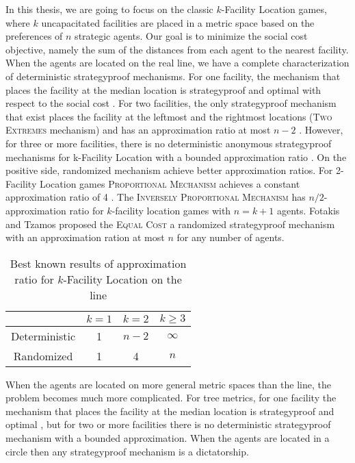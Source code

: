 In this thesis, we are going to focus on the classic $k$-Facility Location games, where $k$ uncapacitated facilities are placed in a metric space based on the preferences of $n$ strategic agents. Our goal is to minimize the social cost objective, namely the sum of the distances from each agent to the nearest facility. When the agents are located on the real line, we have a complete characterization of deterministic strategyproof mechanisms. For one facility, the mechanism that places the facility at the median location is strategyproof and optimal with respect to the social cost \cite{Procaccia2013}. For two facilities, the only strategyproof mechanism that exist places the facility at the leftmost and the rightmost locations (\textsc{Two Extremes} mechanism) and has an approximation ratio at most $n-2$ \cite{Procaccia2013,Fotakis2014}. However, for three or more facilities, there is no deterministic anonymous strategyproof mechanisms for k-Facility Location with a bounded approximation ratio \cite{Fotakis2014}. On the positive side, randomized mechanism achieve better approximation ratios. For 2-Facility Location games \textsc{Proportional Mechanism} achieves a constant approximation ratio of 4 \cite{Lu2010}. The \textsc{Inversely Proportional Mechanism} \cite{escoffier2011} has $n/2$-approximation ratio for $k$-facility location games with $n=k+1$ agents. Fotakis and Tzamos \cite{Fotakis2013sp} proposed the \textsc{Equal Cost} a randomized strategyproof mechanism with an approximation ration at most $n$ for any number of agents.

\begin{table}[ht]
    \centering
    \begin{tabular}{|c|c|c|c|}
         \hline
         & $k=1$ & $k=2$ & $k\ge3$ \\ \hline 
        Deterministic & 1\cite{Moulin1980} & $n-2$ \cite{Procaccia2013} & $\infty$ \cite{Fotakis2013}\\ \hline
        Randomized & 1\cite{Moulin1980} & 4 \cite{Lu2010} & $n$ \cite{Fotakis2013sp} \\ \hline
    \end{tabular}
    \caption{Best known results of approximation ratio for $k$-Facility Location on the line}
    \label{tab:summaryLine}
\end{table}


When the agents are located on more general metric spaces than the line, the problem becomes much more complicated. For tree metrics, for one facility the mechanism that places the facility at the median location is strategyproof and optimal \cite{Schummer2002}, but for two or more facilities there is no deterministic strategyproof mechanism with a bounded approximation. When the agents are located in a circle then any strategyproof mechanism is a dictatorship.

